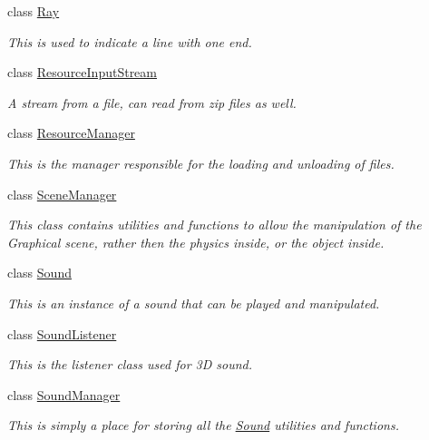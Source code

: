 \begin{DoxyCompactItemize}
class \hyperlink{classphys_1_1Ray}{Ray}
\begin{DoxyCompactList}\small\item\em This is used to indicate a line with one end. \item\end{DoxyCompactList}\item 
class \hyperlink{classphys_1_1ResourceInputStream}{ResourceInputStream}
\begin{DoxyCompactList}\small\item\em A stream from a file, can read from zip files as well. \item\end{DoxyCompactList}\item 
class \hyperlink{classphys_1_1ResourceManager}{ResourceManager}
\begin{DoxyCompactList}\small\item\em This is the manager responsible for the loading and unloading of files. \item\end{DoxyCompactList}\item 
class \hyperlink{classphys_1_1SceneManager}{SceneManager}
\begin{DoxyCompactList}\small\item\em This class contains utilities and functions to allow the manipulation of the Graphical scene, rather then the physics inside, or the object inside. \item\end{DoxyCompactList}\item 
class \hyperlink{classphys_1_1Sound}{Sound}
\begin{DoxyCompactList}\small\item\em This is an instance of a sound that can be played and manipulated. \item\end{DoxyCompactList}\item 
class \hyperlink{classphys_1_1SoundListener}{SoundListener}
\begin{DoxyCompactList}\small\item\em This is the listener class used for 3D sound. \item\end{DoxyCompactList}\item 
class \hyperlink{classphys_1_1SoundManager}{SoundManager}
\begin{DoxyCompactList}\small\item\em This is simply a place for storing all the \hyperlink{classphys_1_1Sound}{Sound} utilities and functions. \item\end{DoxyCompactList}\item 

\end{DoxyCompactItemize}

